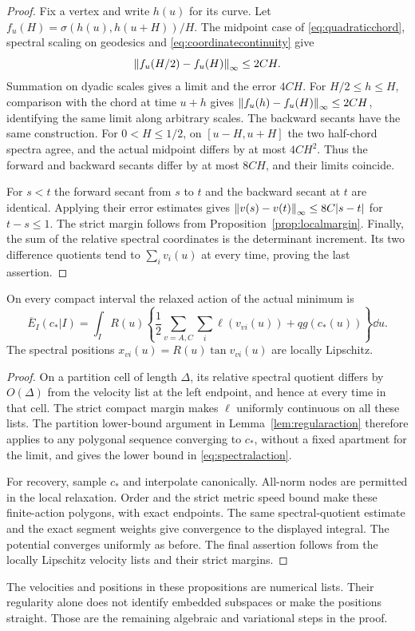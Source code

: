 \begin{proof}
Fix a vertex and write $h(u)$ for its curve. Let
$f_u(H)=\sigma(h(u),h(u+H))/H$. The midpoint case of
\eqref{eq:quadraticchord}, spectral scaling on geodesics and
\eqref{eq:coordinatecontinuity} give
\[
 \left\lVert f_u(H/2)-f_u(H)\right\rVert_\infty\le2CH.
\]
Summation on dyadic scales gives a limit and the error $4CH$.
For $H/2\le h\le H$, comparison with the chord at time $u+h$
gives $\left\lVert f_u(h)-f_u(H)\right\rVert_\infty\le2CH$, identifying the
same limit along arbitrary scales. The backward secants have the
same construction. For $0<H\le1/2$, on $[u-H,u+H]$ the two half-chord spectra agree,
and the actual midpoint differs by at most $4CH^2$. Thus the
forward and backward secants differ by at most $8CH$, and their
limits coincide.

For $s<t$ the forward secant from $s$ to $t$ and the backward secant
at $t$ are identical. Applying their error estimates gives
$\left\lVert v(s)-v(t)\right\rVert_\infty\le8C|s-t|$ for $t-s\le1$.
The strict margin follows from Proposition~\ref{prop:localmargin}.
Finally, the sum of the relative spectral coordinates is the
determinant increment. Its two difference quotients tend to
$\sum_i v_i(u)$ at every time, proving the last assertion.
\end{proof}

\begin{proposition}\label{prop:spectralaction}
On every compact interval the relaxed action of the actual minimum is
\begin{equation}\label{eq:spectralaction}
 \overline E_I(c_*|I)=\int_I R(u)
 \left\{\frac12\sum_{v=A,C}\sum_i\ell(v_{vi}(u))+qg(c_*(u))\right\}\dd u.
\end{equation}
The spectral positions $x_{vi}(u)=R(u)\tan v_{vi}(u)$ are locally
Lipschitz.
\end{proposition}

\begin{proof}
On a partition cell of length $\Delta$, its relative spectral
quotient differs by $O(\Delta)$ from the velocity list at the left
endpoint, and hence at every time in that cell. The strict compact
margin makes $\ell$ uniformly continuous on all these lists.
The partition lower-bound argument in
Lemma~\ref{lem:regularaction} therefore applies to any polygonal
sequence converging to $c_*$, without a fixed apartment for the
limit, and gives the lower bound in \eqref{eq:spectralaction}.

For recovery, sample $c_*$ and interpolate canonically. All-norm
nodes are permitted in the local relaxation. Order and the strict
metric speed bound make these finite-action polygons, with exact
endpoints. The same spectral-quotient estimate and the exact
segment weights give convergence to the displayed integral. The
potential converges uniformly as before. The final assertion follows
from the locally Lipschitz velocity lists and their strict margins.
\end{proof}

The velocities and positions in these propositions are numerical lists.
Their regularity alone does not identify embedded subspaces or make the
positions straight. Those are the remaining algebraic and variational
steps in the proof.

